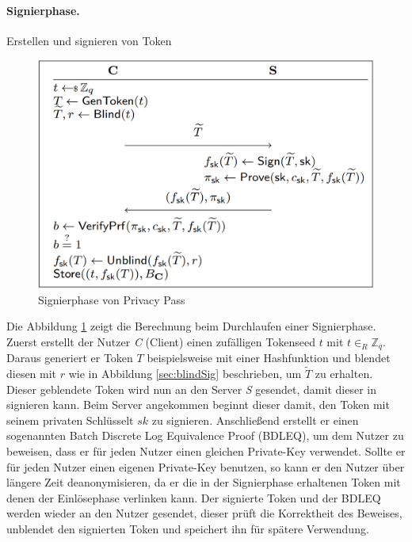 \documentclass{scrreprt}
\begin{document}
\paragraph{Signierphase.} Erstellen und signieren von Token
\begin{figure}[H]
    \centering
    \includegraphics[width=0.5\linewidth]{pp_signphase.png}
    \caption{Signierphase von Privacy Pass \cite{pp-davidson2018privacy}}
    \label{fig:pp-signingphase}
\end{figure}
Die Abbildung \ref{fig:pp-signingphase} zeigt die Berechnung beim Durchlaufen einer Signierphase. Zuerst erstellt der Nutzer \textit{C} (Client) einen zufälligen Tokenseed $t$ mit $t {\in}_R \mathbb{Z}_q $. Daraus generiert er Token $T$ beispielsweise mit einer Hashfunktion und blendet diesen mit $r$ wie in Abbildung \ref{sec:blindSig} beschrieben, um $\widetilde{T}$ zu erhalten. Dieser geblendete Token wird nun an den Server \textit{S} gesendet, damit dieser in signieren kann. Beim Server angekommen beginnt dieser damit, den Token mit seinem privaten Schlüsselt $sk$ zu signieren. Anschließend erstellt er einen sogenannten Batch Discrete Log Equivalence Proof (BDLEQ), um dem Nutzer zu beweisen, dass er für jeden Nutzer einen gleichen Private-Key verwendet. Sollte er für jeden Nutzer einen eigenen Private-Key benutzen, so kann er den Nutzer über längere Zeit deanonymisieren, da er die in der Signierphase erhaltenen Token mit denen der Einlösephase verlinken kann. Der signierte Token und der BDLEQ werden wieder an den Nutzer gesendet, dieser prüft die Korrektheit des Beweises, unblendet den signierten Token und speichert ihn für spätere Verwendung. 
\end{document}
